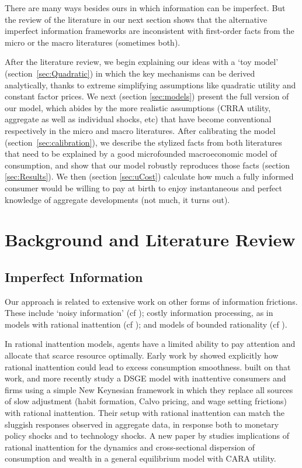 \documentclass[titlepage]{\econtex}
\begin{document}
There are many ways besides ours in which information can be imperfect.  But the review of the literature in our next section shows that the alternative imperfect information frameworks are inconsistent with first-order facts from the micro or the macro literatures (sometimes both).

After the literature review, we begin explaining our ideas with a `toy model' (section~\ref{sec:Quadratic}) in which the key mechanisms can be derived analytically, thanks to extreme simplifying assumptions like quadratic utility and constant factor prices.  We next (section \ref{sec:models}) present the full version of our model, which abides by the more realistic assumptions (CRRA utility, aggregate as well as individual shocks, etc) that have become conventional respectively in the micro and macro literatures. After calibrating the model (section~\ref{sec:calibration}), we describe the stylized facts from both literatures that need to be explained by a good microfounded macroeconomic model of consumption, and show that our model robustly reproduces those facts (section \ref{sec:Results}).
We then (section \ref{sec:uCost}) calculate how much a fully informed consumer would be willing to pay at birth to enjoy instantaneous and perfect knowledge of aggregate developments (not much, it turns out).

\hypertarget{Literature}{}
\section{Background and Literature Review}\label{sec:relation}

\hypertarget{Imperfect-Information}{}
\subsection{Imperfect Information}
Our approach is related to extensive work on other forms of information frictions. These include `noisy information' (cf \cite{pischkeMicroMacro}); costly information processing, as in models with rational inattention (cf \cite{simsInattention}); and models of bounded rationality (cf \cite{gabaixSparsityQJE}).

In rational inattention models, agents have a limited ability to pay attention and allocate that scarce resource optimally. Early work by \cite{reis:inattentive} showed explicitly how rational inattention could lead to excess consumption smoothness.
\cite{mw09:RI} built on that work, and more recently \cite{mackWiedREStud15} study a DSGE model with inattentive consumers and firms using a simple New Keynesian framework in which they replace all sources of slow adjustment (habit formation, Calvo pricing, and wage setting frictions) with rational inattention. %
Their setup with rational inattention can match the sluggish responses observed in aggregate data, in response both to monetary policy shocks and to technology shocks. A new paper by \cite{LuoRinGE} studies implications of rational inattention for the dynamics and cross-sectional dispersion of consumption and wealth in a general equilibrium model with CARA utility.
\end{document}
